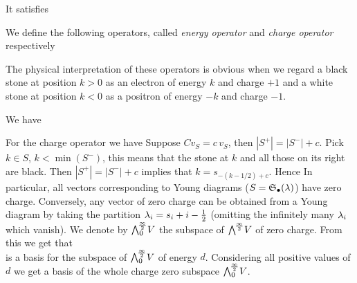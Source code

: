 \documentclass[10pt,handout]{beamer} %
\begin{document}
\begin{frame}

\begin{definition}
\end{definition}

It satisfies\\[-15pt]
\vspace*{-\baselineskip}\pause

\begin{definition}
We define the following operators, called \emph{energy operator} and \emph{charge operator} respectively\\[-15pt]
\end{definition}

The physical interpretation of these operators is obvious when we regard a black stone at position $k>0$ as an electron of energy $k$ and charge $+1$ and a white stone at position $k<0$ as a positron of energy $-k$ and charge $-1$. \pause

We have\\[-15pt]

\end{frame}

\begin{frame}

For the charge operator we have 
\pause
Suppose $Cv_S=c\,v_S$, then $|S^+|=|S^-|+c$. Pick $k\in S$, $k<\min (S^-)$, this means that the stone at $k$ and all those on its right are black. Then $|S^+|=|S^-|+c$ implies that $k=s_{-(k-1/2)+c}$. Hence
\pause
In particular, all vectors corresponding to Young diagrams ($S=\mathfrak S_\bullet(\lambda)$) have zero charge. Conversely, any vector of zero charge can be obtained from a Young diagram by taking the partition $\lambda_i=s_i+i-\frac12$ (omitting the infinitely many $\lambda_i$ which vanish). We denote by $\bigwedge^{\!\frac\infty2}_0\!V$ the subspace of $\bigwedge^{\!\frac\infty2}\!V$ of zero charge. \pause From this we get that\\[-15pt]
is a basis for the subspace of $\bigwedge^{\!\frac\infty2}_0\!V$ of energy $d$. Considering all positive values of $d$ we get a basis of the whole charge zero subspace $\bigwedge^{\!\frac\infty2}_0\!V$. 

\end{frame}
\end{document}

